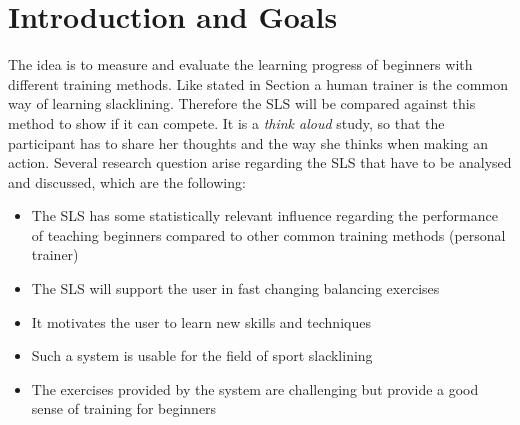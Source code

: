 \section{Introduction and Goals}

The idea is to measure and evaluate the learning progress of beginners with different training methods. Like stated in Section  a human trainer is the common way of learning slacklining. 
Therefore the SLS will be compared against this method to show if it can compete. It is a \textit{think aloud} study, so that the participant has to share her thoughts and the way she thinks when making an action.
Several research question arise regarding the SLS that have to be analysed and discussed, which are the following:

\begin{itemize}
\item The SLS has some statistically relevant influence regarding the performance of teaching beginners compared to other common training methods (personal trainer)
\item The SLS will support the user in fast changing balancing exercises
\item It motivates the user to learn new skills and techniques
\item Such a system is usable for the field of sport slacklining
\item The exercises provided by the system are challenging but provide a good sense of training for beginners
\end{itemize}
